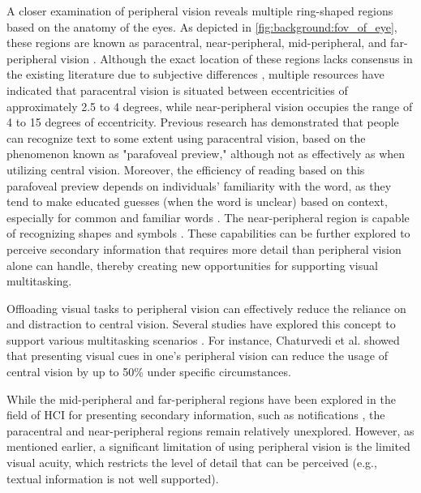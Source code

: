 A closer examination of peripheral vision reveals multiple ring-shaped regions based on the anatomy of the eyes. As depicted in \autoref{fig:background:fov_of_eye}, these regions are known as paracentral, near-peripheral, mid-peripheral, and far-peripheral vision \cite{strasburger_peripheral_2011, chaturvedi_peripheral_2019, ku_peritext_2019}.
Although the exact location of these regions lacks consensus in the existing literature due to subjective differences \cite{strasburger_peripheral_2011}, multiple resources \cite{chaturvedi_peripheral_2019, ku_peritext_2019} have indicated that paracentral vision is situated between eccentricities of approximately 2.5 to 4 degrees, while near-peripheral vision occupies the range of 4 to 15 degrees of eccentricity.
Previous research \cite{schotter_parafoveal_2012, rayner_eye_1998} has demonstrated that people can recognize text to some extent using paracentral vision, based on the phenomenon known as "parafoveal preview," although not as effectively as when utilizing central vision. Moreover, the efficiency of reading based on this parafoveal preview depends on individuals' familiarity with the word, as they tend to make educated guesses (when the word is unclear) based on context, especially for common and familiar words \cite{schotter_parafoveal_2012}. The near-peripheral region is capable of recognizing shapes and symbols \cite[Ch~C.9]{ishiguro_peripheral_2011, panero1979human}. These capabilities can be further explored to perceive secondary information that requires more detail than peripheral vision alone can handle, thereby creating new opportunities for supporting visual multitasking.


Offloading visual tasks to peripheral vision can effectively reduce the reliance on and distraction to central vision. Several studies have explored this concept to support various multitasking scenarios \cite{chaturvedi_peripheral_2019, ishiguro_peripheral_2011, gruenefeld_guiding_2018, luyten_hidden_2016, poppinga_ambiglasses_2012, costanza_eye_q_2006, nakuo_smart_2016, ku_peritext_2019}. For instance, Chaturvedi et al. \cite{chaturvedi_peripheral_2019} showed that presenting visual cues in one's peripheral vision can reduce the usage of central vision by up to 50\% under specific circumstances.


While the mid-peripheral and far-peripheral regions have been explored in the field of HCI for presenting secondary information, such as notifications \cite{luyten_hidden_2016, nakuo_smart_2016, chaturvedi_peripheral_2019, gruenefeld_guiding_2018, poppinga_ambiglasses_2012, costanza_eye_q_2006}, the paracentral and near-peripheral regions \cite{ku_peritext_2019} remain relatively unexplored.
However, as mentioned earlier, a significant limitation of using peripheral vision is the limited visual acuity, which restricts the level of detail that can be perceived (e.g., textual information is not well supported).

